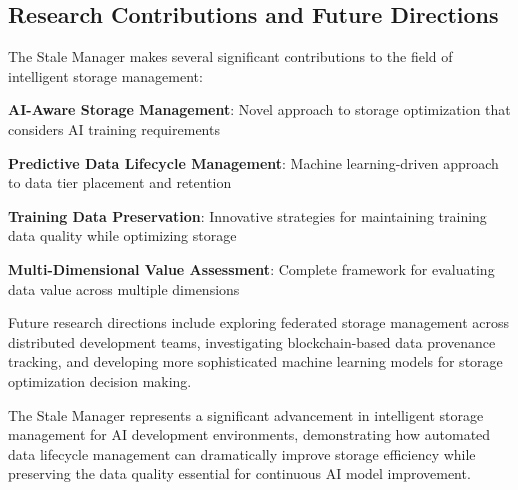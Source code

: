 \subsection*{Research Contributions and Future Directions}

The Stale Manager makes several significant contributions to the field of intelligent storage management:

\begin{expandedlist}
    \item \textbf{AI-Aware Storage Management}: Novel approach to storage optimization that considers AI training requirements
    \item \textbf{Predictive Data Lifecycle Management}: Machine learning-driven approach to data tier placement and retention
    \item \textbf{Training Data Preservation}: Innovative strategies for maintaining training data quality while optimizing storage
    \item \textbf{Multi-Dimensional Value Assessment}: Complete framework for evaluating data value across multiple dimensions
\end{expandedlist}

Future research directions include exploring federated storage management across distributed development teams, investigating blockchain-based data provenance tracking, and developing more sophisticated machine learning models for storage optimization decision making.

The Stale Manager represents a significant advancement in intelligent storage management for AI development environments, demonstrating how automated data lifecycle management can dramatically improve storage efficiency while preserving the data quality essential for continuous AI model improvement.
